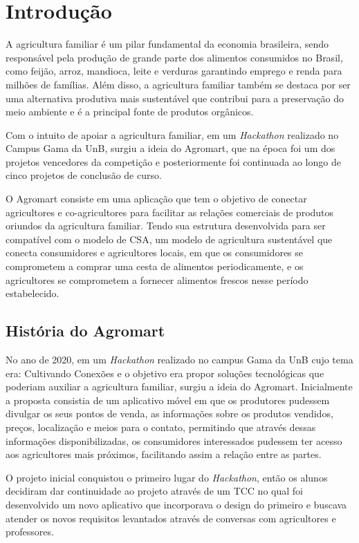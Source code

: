 \chapter[Introdução]{Introdução}

A agricultura familiar é um pilar fundamental da economia brasileira, sendo responsável pela produção de grande parte dos alimentos consumidos no Brasil, como feijão, arroz, mandioca, leite e verduras garantindo emprego e renda para milhões de famílias. Além disso, a agricultura familiar também se destaca por ser uma alternativa produtiva mais sustentável que contribui para a preservação do meio ambiente e é a principal fonte de produtos orgânicos.

Com o intuito de apoiar a agricultura familiar, em um \textit{Hackathon} realizado no Campus Gama da UnB, surgiu a ideia do Agromart, que na época foi um dos projetos vencedores da competição e posteriormente foi continuada ao longo de cinco projetos de conclusão de curso.

O Agromart consiste em uma aplicação que tem o objetivo de conectar agricultores e co-agricultores para facilitar as relações comerciais de produtos oriundos da agricultura familiar. Tendo sua estrutura desenvolvida para ser compatível com o modelo de CSA, um modelo de agricultura sustentável que conecta consumidores e agricultores locais, em que os consumidores se comprometem a comprar uma cesta de alimentos periodicamente, e os agricultores se comprometem a fornecer alimentos frescos nesse período estabelecido.

\section{História do Agromart}

No ano de 2020, em um \textit{Hackathon} realizado no campus Gama da UnB cujo tema era: Cultivando Conexões e o objetivo era propor soluções tecnológicas que poderiam auxiliar a agricultura familiar, surgiu a ideia do Agromart. Inicialmente a proposta consistia de um aplicativo móvel em que os produtores pudessem divulgar os seus pontos de venda, as informações sobre os produtos vendidos, preços, localização e meios para o contato, permitindo que através dessas informações disponibilizadas, os consumidores interessados pudessem ter acesso aos agricultores mais próximos, facilitando assim a relação entre as partes. \cite{rodriguesemacedo2021}

O projeto inicial conquistou o primeiro lugar do \textit{Hackathon}, então os alunos decidiram dar continuidade ao projeto através de um TCC no qual foi desenvolvido um novo aplicativo que incorporava o design do primeiro e buscava atender os novos requisitos levantados através de conversas com agricultores e professores. \cite{rodriguesemacedo2021}

